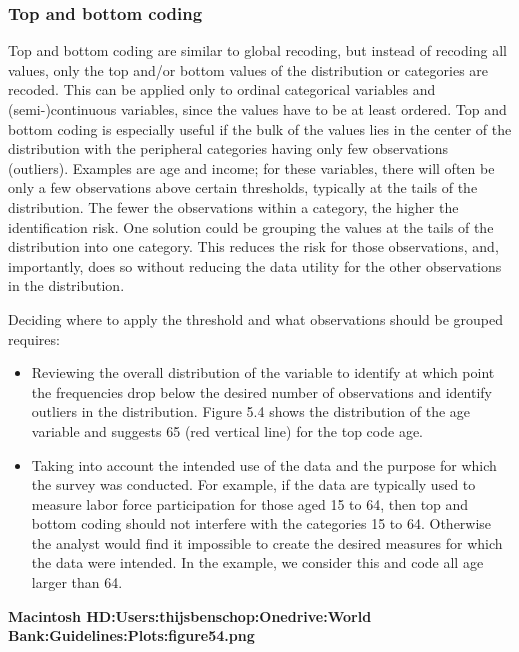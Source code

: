 \documentclass[letterpaper,10pt,english]{sphinxmanual}
\begin{document}
\subsubsection{Top and bottom coding}
\label{\detokenize{anon_methods:top-and-bottom-coding}}
Top and bottom coding are similar to global recoding, but instead of
recoding all values, only the top and/or bottom values of the
distribution or categories are recoded. This can be applied only to
ordinal categorical variables and (semi-)continuous variables, since the
values have to be at least ordered. Top and bottom coding is especially
useful if the bulk of the values lies in the center of the distribution
with the peripheral categories having only few observations (outliers).
Examples are age and income; for these variables, there will often be
only a few observations above certain thresholds, typically at the tails
of the distribution. The fewer the observations within a category, the
higher the identification risk. One solution could be grouping the
values at the tails of the distribution into one category. This reduces
the risk for those observations, and, importantly, does so without
reducing the data utility for the other observations in the
distribution.

Deciding where to apply the threshold and what observations should be
grouped requires:
\begin{itemize}
\item {} 
Reviewing the overall distribution of the variable to identify at
which point the frequencies drop below the desired number of
observations and identify outliers in the distribution. Figure 5.4
shows the distribution of the age variable and suggests 65 (red
vertical line) for the top code age.

\item {} 
Taking into account the intended use of the data and the purpose for
which the survey was conducted. For example, if the data are
typically used to measure labor force participation for those aged 15
to 64, then top and bottom coding should not interfere with the
categories 15 to 64. Otherwise the analyst would find it impossible
to create the desired measures for which the data were intended. In
the example, we consider this and code all age larger than 64.

\end{itemize}

{\color{red}\bfseries{}\textbar{}Macintosh HD:Users:thijsbenschop:Onedrive:World
Bank:Guidelines:Plots:figure54.png\textbar{}}
\end{document}
